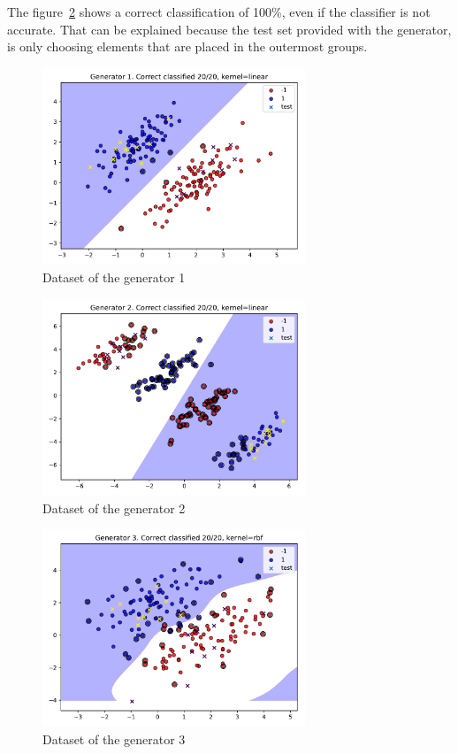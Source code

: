 \documentclass[a4paper]{article}
\begin{document}
The figure~\ref{fig:ex1gen2} shows a correct classification of 100\%, even if 
the classifier is not accurate. That can be explained because the test set 
provided with the generator, is only choosing elements that are placed in the 
outermost groups.
%
\begin{figure}[H]
	\centering
	\includegraphics[width=0.7\textwidth]{ex1/1.pdf}
	\caption{Dataset of the generator 1}
	\label{fig:ex1gen1}
\end{figure}
\begin{figure}[H]
	\centering
	\includegraphics[width=0.7\textwidth]{ex1/2.pdf}
	\caption{Dataset of the generator 2}
	\label{fig:ex1gen2}
\end{figure}
\begin{figure}[H]
	\centering
	\includegraphics[width=0.7\textwidth]{ex1/3.pdf}
	\caption{Dataset of the generator 3}
	\label{fig:ex1gen3}
\end{figure}
\end{document}
